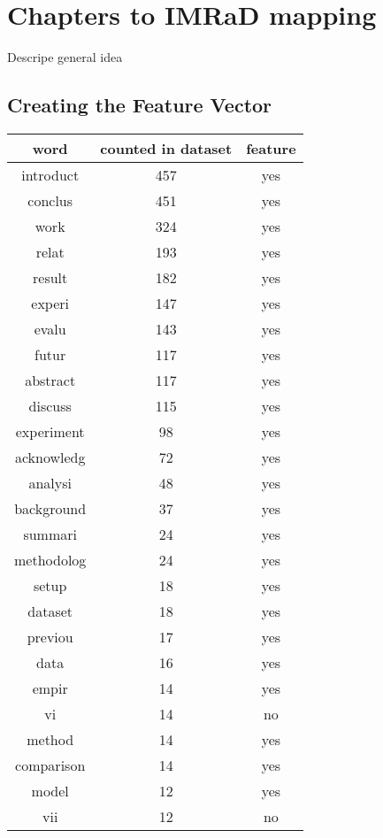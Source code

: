 \section{Chapters to IMRaD mapping}
\label{sec:chapters-to-imrad-mapping}

Descripe general idea

\subsection{Creating the Feature Vector}
\label{subsec:creating-feature-vector}

\begin{tabular}{| c | c | c |}
\hline
\rowcolor{lightblue}
\textbf{word} & \textbf{counted in datase}t & \textbf{feature} \\ \hline
introduct & 457 & yes \\ \hline
conclus & 451 & yes \\ \hline
work & 324 & yes \\ \hline
relat & 193 & yes \\ \hline
result & 182 & yes \\ \hline
experi & 147 & yes \\ \hline
evalu & 143 & yes \\ \hline
futur & 117 & yes \\ \hline
abstract & 117 & yes \\ \hline
discuss & 115 & yes \\ \hline
experiment & 98 & yes \\ \hline
acknowledg & 72 & yes \\ \hline
analysi & 48 & yes \\ \hline
background & 37 & yes \\ \hline
summari & 24 & yes \\ \hline
methodolog & 24 & yes \\ \hline
setup & 18 & yes \\ \hline
dataset & 18 & yes \\ \hline
previou & 17 & yes \\ \hline
data & 16 & yes \\ \hline
empir & 14 & yes \\ \hline
vi & 14 & no \\ \hline
method & 14 & yes \\ \hline
comparison & 14 & yes \\ \hline
model & 12 & yes \\ \hline
vii & 12 & no \\ \hline

\end{tabular}
